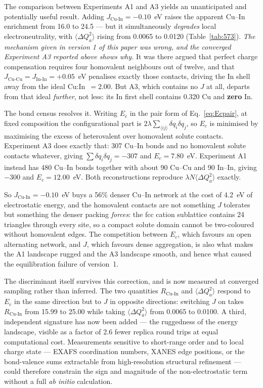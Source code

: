 \documentclass[11pt,a4paper]{article}
\newcommand{\dQ}{\Delta Q}
\newcommand{\RCuIn}{R_{\mathrm{Cu\text{-}In}}}
\begin{document}
The comparison between Experiments A1 and A3 yields an unanticipated and
potentially useful result. Adding $J_{\mathrm{Cu\text{-}In}} = -0.10$~eV raises
the apparent Cu--In enrichment from 16.0 to 24.5 --- but it simultaneously
\emph{degrades} local electroneutrality, with $\langle \dQ_a^2 \rangle$ rising
from 0.0065 to 0.0120 (Table~\ref{tab:573}). \emph{The mechanism given in version 1 of this paper was wrong, and the
converged Experiment A3 reported above shows why.} It was there argued that
perfect charge compensation requires four homovalent neighbours out of twelve,
and that $J_{\mathrm{Cu\text{-}Cu}} = J_{\mathrm{In\text{-}In}} = +0.05$~eV
penalises exactly those contacts, driving the In shell away from the ideal
Cu:In~$=2.00$. But A3, which contains no $J$ at all, departs from that ideal
\emph{further}, not less: its In first shell contains 0.320 Cu and
\textbf{zero} In.

The bond census resolves it. Writing $E_c$ in the pair form of
Eq.~\eqref{eq:Ecpair}, at fixed composition the configurational part is
$2\lambda \sum_{\langle ij\rangle} \delta q_i \delta q_j$, so $E_c$ is minimised
by maximising the excess of heterovalent over homovalent solute contacts.
Experiment A3 does exactly that: 307 Cu--In bonds and no homovalent solute
contacts whatever, giving $\sum \delta q_i \delta q_j = -307$ and
$E_c = 7.80$~eV. Experiment A1 instead has 480 Cu--In bonds together with about
90 Cu--Cu and 90 In--In, giving $-300$ and $E_c = 12.00$~eV. Both reconstructions
reproduce $\lambda N \langle \dQ_a^2\rangle$ exactly.

So $J_{\mathrm{Cu\text{-}In}} = -0.10$~eV buys a 56\% denser Cu--In network at
the cost of 4.2~eV of electrostatic energy, and the homovalent contacts are not
something $J$ tolerates but something the denser packing \emph{forces}: the fcc
cation sublattice contains 24 triangles through every site, so a compact solute
domain cannot be two-coloured without homovalent edges. The competition between
$E_c$, which favours an open alternating network, and $J$, which favours dense
aggregation, is also what makes the A1 landscape rugged and the A3 landscape
smooth, and hence what caused the equilibration failure of version~1.

The discriminant itself survives this correction, and is now measured at
converged sampling rather than inferred. The two quantities $\RCuIn$ and
$\langle \dQ_a^2 \rangle$ respond to $E_c$ in the same direction but to $J$ in
opposite directions: switching $J$ on takes $\RCuIn$ from 15.99 to 25.00 while
taking $\langle \dQ_a^2\rangle$ from 0.0065 to 0.0100. A third, independent
signature has now been added --- the ruggedness of the energy landscape, visible
as a factor of 2.6 fewer replica round trips at equal computational cost. Measurements sensitive to
short-range order and to local charge state --- EXAFS coordination numbers,
XANES edge positions, or the bond-valence sums extractable from high-resolution
structural refinement --- could therefore constrain the sign and magnitude of the
non-electrostatic term without a full \textit{ab initio} calculation.
\end{document}
